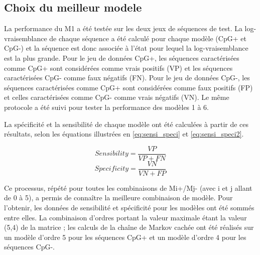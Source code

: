 \documentclass[10pt,a4paper,notitlepage,colorinlistoftodos]{article}
\begin{document}
\begin{multicols}{2}

\subsection*{Choix du meilleur modele}
La performance du M1 a été testée sur les deux jeux de séquences de test. La log-vraisemblance de chaque séquence a été calculé pour chaque modèle (CpG+ et CpG-) et la séquence est donc associée à l’état pour lequel la log-vraisemblance est la plus grande. Pour le jeu de données CpG+, les séquences caractérisées comme CpG+ sont considérées comme vrais positifs (VP) et les séquences caractérisées CpG- comme faux négatifs (FN). Pour le jeu de données CpG-, les séquences caractérisées comme CpG+ sont considérées comme faux positifs (FP) et celles caractérisées comme CpG- comme vrais négatifs (VN). Le même protocole a été suivi pour tester la performance des modèles 1 à 6.
		 
La spécificité et la sensibilité de chaque modèle ont été calculées à partir de ces résultats, selon les équations  illustrées en \ref{eq:sensi_speci} et \ref{eq:sensi_speci2}.

\begin{equation}
Sensibility = \frac{VP}{VP+FN}%
\label{eq:sensi_speci}
\end{equation}
\begin{equation}
Specificity = \frac{VN}{VN+FP}
\label{eq:sensi_speci2}
\end{equation}



Ce processus, répété pour toutes les combinaisons de Mi+/Mj- (avec i et j allant de 0 à 5), a permis de connaître la meilleure combinaison de modèle. Pour l’obtenir, les données de sensibilité et spécificité pour les modèles ont été sommés entre elles. La combinaison d’ordres portant la valeur maximale étant la valeur (5,4) de la matrice ; les calculs de la chaîne de Markov cachée ont été réalisés sur un modèle d’ordre 5 pour les séquences CpG+ et un modèle d’ordre 4 pour les séquences CpG-. %


\end{multicols}
\end{document}
